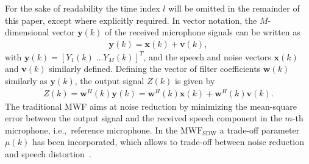 \documentclass{article}
\begin{document}
For the sake of readability the time index $l$ will be omitted in the remainder of this paper, except where explicitly required.
In vector notation, the $M$-dimensional vector $\mathbf{y}(k)$ of the received microphone signals can be written as
\begin{align}
  \mathbf{y}(k) = \mathbf{x}(k) + \mathbf{v}(k),
\end{align}
with $\mathbf{y}(k) = [Y_1(k) \; \ldots Y_M(k)]^T$, and the speech and noise vectors $\mathbf{x}(k)$ and $\mathbf{v}(k)$ similarly defined.
Defining the vector of filter coefficients $\mathbf{w}(k)$ similarly as $\mathbf{y}(k)$, the output signal $Z(k)$ is given by
\begin{align}
  Z(k) = \mathbf{w}^H(k) \mathbf{y}(k) = \mathbf{w}^H(k) \mathbf{x}(k) + \mathbf{w}^H(k) \mathbf{v}(k).
\end{align}
The traditional MWF aims at noise reduction by minimizing the mean-square error between the output signal and the received speech component in the $m$-th microphone, i.e.,~reference microphone.
In the $\text{MWF}_{\text{SDW}}$ a trade-off parameter $\mu(k)$ has been incorporated, which allows to trade-off between noise reduction and speech distortion~\cite{Doclo_ITSP_2002,Spriet_SP_2004}.
\end{document}

